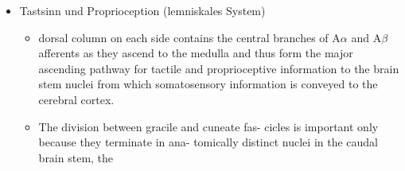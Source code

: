 \documentclass[12pt,a4paper,pdftex]{article}
\begin{document}
\begin{itemize}
    \item Tastsinn und Proprioception (lemniskales System)
    \begin{itemize}
    \begin{comment}
        \item \cite{kandel2013principles} page 447
        \item The cell body of a dorsal root ganglion neuron lies in a ganglion on the dorsal root of a spinal or cranial nerve. Dorsal root ganglion neurons originate from the neural crest and are intimately associated with the nearby segment of the spinal cord. \cite{kandel2013principles}
        \item The nerve fibers that convey the various somatosensory submodalities from each dermatome are bundled together in the peripheral nerves as they enter the dorsal root ganglia. However, as the fibers exit the ganglia and approach the spinal cord, the large- and small-diameter fibers separate into medial and lateral divisions.
        \item The medial division includes large, myelinated
        A$\alpha$ and A$\beta$ fibers that transmit proprioceptive and
        cutaneous information from a dermatome. The lat-
        eral division includes small thinly myelinated A$\delta$ and
        unmyelinated C fibers that transmit noxious, thermal,
        and visceral information from the same dermatome. \cite{kandel2013principles}
        \item As a general
        rule the largest fibers (A$\alpha$) terminate in or near the
        ventral horn, the medium-size fibers (A$\beta$) from the
        skin and muscle terminate in intermediate layers of the dorsal horn, and the smallest fibers (A$\delta$ and C)
        terminate in the most dorsal portion of the spinal
        gray matter.
        \end{comment}
        \item dorsal column on each side contains the central
        branches of A$\alpha$ and A$\beta$ afferents as they ascend to the
        medulla and thus form the major ascending pathway
        for tactile and proprioceptive information to the brain
        stem nuclei from which somatosensory information
        is conveyed to the cerebral cortex.
        \item The division between gracile and cuneate fas-
        cicles is important only because they terminate in ana-
        tomically distinct nuclei in the caudal brain stem, the

\end{itemize}
\end{itemize}
\end{document}
